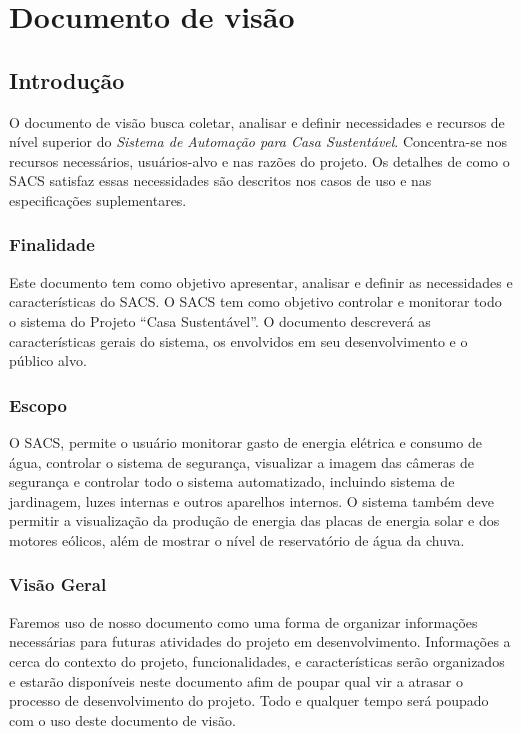 \chapter{Documento de visão}
\section{Introdução}

	O documento de visão busca coletar, analisar e definir necessidades e recursos de nível superior do \textit{Sistema de Automação para Casa Sustentável}. Concentra-se nos recursos necessários, usuários-alvo e nas razões do projeto. Os detalhes de como o SACS satisfaz essas necessidades são descritos nos casos de uso e nas especificações suplementares.

\subsection{Finalidade}

	Este documento tem como objetivo apresentar, analisar e definir as necessidades e características do SACS. O SACS tem como objetivo controlar e monitorar todo o sistema do Projeto “Casa Sustentável”. O documento descreverá as características gerais do sistema, os envolvidos em seu desenvolvimento e o público alvo.


\subsection{Escopo}

	O SACS, permite o usuário monitorar gasto de energia elétrica e consumo de água, controlar o sistema de segurança, visualizar a imagem das câmeras de segurança e controlar todo o sistema automatizado, incluindo sistema de jardinagem, luzes internas e outros aparelhos internos. O sistema também deve permitir a visualização da produção de energia das placas de energia solar e dos motores eólicos, além de mostrar o nível de reservatório de água da chuva.

\subsection{Visão Geral}

	Faremos uso de nosso documento como uma forma de organizar informações necessárias para futuras atividades do projeto em desenvolvimento. Informações a cerca do contexto do projeto, funcionalidades, e características serão organizados e estarão disponíveis neste documento afim de poupar qual vir a atrasar o processo de desenvolvimento do projeto. Todo e qualquer tempo será poupado com o uso deste documento de visão.

